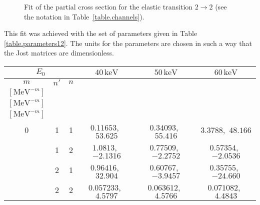 \documentclass[12pt]{article}
\begin{document}
\begin{figure}
\centerline{}
\caption{\sf
Fit of the partial cross section for the elastic transition $2\to2$
(see the notation in Table~\ref{table.channels}).
}
\label{fig.fit22}
\end{figure}

This fit was achieved with the set of parameters given in Table
\ref{table.parameters12}. The units for the parameters are chosen in such a way
that the Jost matrices are dimensionless.

\begin{table}
\begin{center}
\begin{tabular}{|c|c|c|c|c|c|}
\hline
\multicolumn{3}{|c|}{$E_0$}
& $40\,\mathrm{keV}$ & $50\,\mathrm{keV}$ & $60\,\mathrm{keV}$\\
\hline
$m$ & $n'$ & $n$
&
\parbox{2cm}{\begin{center}
$a_{n'n}^{(m)}$,\ $b_{n'n}^{(m)}$\\[1mm]
$[\mathrm{MeV}^{-m}]$\end{center}}
&
\parbox{2cm}{\begin{center}
$a_{n'n}^{(m)}$,\ $b_{n'n}^{(m)}$\\[1mm]
$[\mathrm{MeV}^{-m}]$\end{center}}
&
\parbox{2cm}{\begin{center}
$a_{n'n}^{(m)}$,\ $b_{n'n}^{(m)}$\\[1mm]
$[\mathrm{MeV}^{-m}]$\end{center}}\\
 & 1 & 1 &
$         0.11653    $,\   $          53.625    $ & %
$0.34093$,\  $55.416$ & %
$          3.3788    $,\   $          48.166    $\\ %
  & 1 & 2 &
$          1.0813    $,\   $         -2.1316    $ & %
$0.77509$,\  $-2.2752$ &
$         0.57354    $,\   $         -2.0536    $\\
  & 2 & 1 &
$         0.96416    $,\   $          32.904    $ & %
$0.60767$,\  $-3.9457$ &
$         0.35755    $,\   $         -24.660    $\\
  & 2 & 2 &
$         0.057233$,\   $          4.5797    $ & %
$0.063612$,\  $4.5766$ &
$         0.071082$,\   $          4.4843    $\\

\end{tabular}
\end{center}
\end{table}
\end{document}
